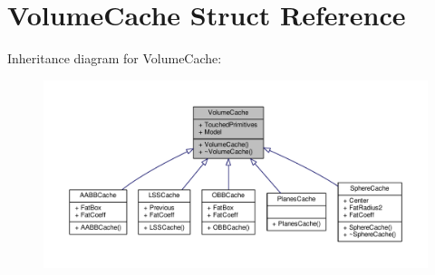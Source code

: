 \hypertarget{structVolumeCache}{}\section{Volume\+Cache Struct Reference}
\label{structVolumeCache}


Inheritance diagram for Volume\+Cache\+:
\nopagebreak
\begin{figure}[H]
\begin{center}
\leavevmode
\includegraphics[width=350pt]{de/d30/structVolumeCache__inherit__graph}
\end{center}
\end{figure}


